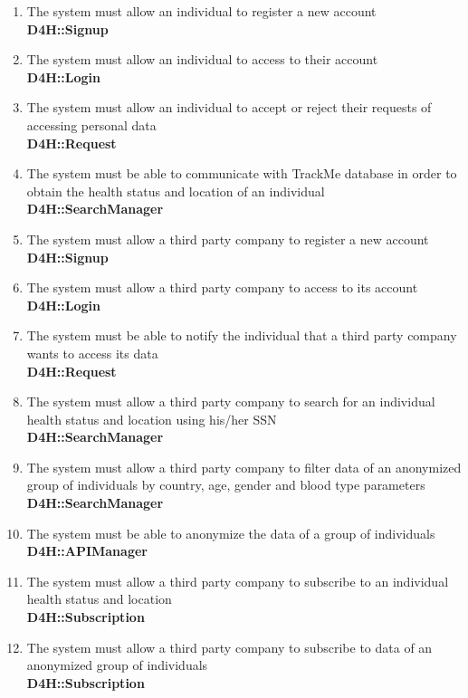 \documentclass[a4paper, hidelinks, 12pt]{report}
\newcommand\requirement[1]{\item[{[R#1]}] }
\begin{document}
	\begin{enumerate}
		\requirement{1} The system must allow an individual to register a new account \\
		\textbf{D4H::Signup}
		\requirement{2} The system must allow an individual to access to their account \\
		\textbf{D4H::Login}
		\requirement{3} The system must allow an individual to accept or reject their requests of accessing personal data \\
		\textbf{D4H::Request}
		\requirement{4} The system must be able to communicate with TrackMe database in order to obtain the health status and location of an individual \\
		\textbf{D4H::SearchManager}
		\requirement{5} The system must allow a third party company to register a new account \\								\textbf{D4H::Signup}
		\requirement{6} The system must allow a third party company to access to its account 	\\								\textbf{D4H::Login}
		\requirement{7} The system must be able to notify the individual that a third party company wants to access its data \\
		\textbf{D4H::Request}
		\requirement{8} The system must allow a third party company to search for an individual health status and location using his/her SSN \\
		 \textbf{D4H::SearchManager}
		 \requirement{9} The system must allow a third party company to filter data of an anonymized group of individuals by country, age, gender and blood type parameters \\ 
		 \textbf{D4H::SearchManager}
		 \requirement{10} The system must be able to anonymize the data of a group of individuals \\
		 \textbf{D4H::APIManager}
		 \requirement{11} The system must allow a third party company to subscribe to an individual health status and location \\ 
		\textbf{D4H::Subscription}
		\requirement{12} The system must allow a third party company to subscribe to data of an anonymized group of individuals \\
		\textbf{D4H::Subscription}
	\end{enumerate}	
\end{document}
